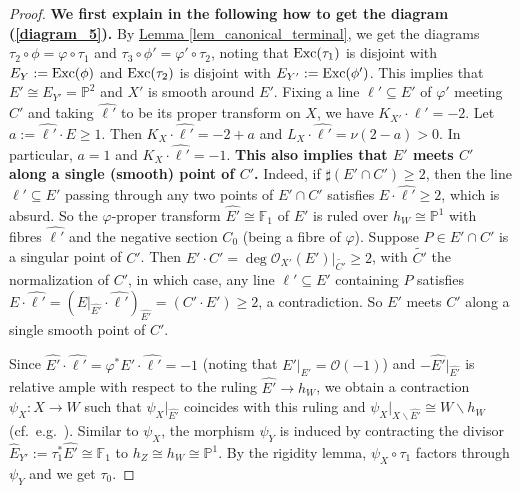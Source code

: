 \begin{proof}
\textbf{We first explain in the following how to get the  diagram (\ref{diagram_5}).}
By {\hyperref[lem_canonical_terminal]{Lemma  \ref*{lem_canonical_terminal}}}, we get the diagrams $\tau_2\circ\phi=\varphi\circ\tau_1$ and $\tau_3\circ\phi'=\varphi'\circ\tau_2$,
noting that $\textup{Exc}(\tau_1)$ is disjoint with $E_Y:=\textup{Exc}(\phi)$ and $\textup{Exc}(\tau_2)$ is  disjoint with $E_{Y'}:=\textup{Exc}(\phi')$.
This implies that $E'\cong E_{Y'}=\mathbb{P}^2$ and  $X'$ is smooth around $E'$.
Fixing a line $\ell'\subseteq E'$ of $\varphi'$ meeting $C'$ and taking $\hat{\ell'}$ to be its proper transform on  $X$,  we have
$K_{X'}\cdot \ell'=-2$.
Let $a:=\hat{\ell'}\cdot E\geqslant 1$. 
Then $K_X\cdot\hat{\ell'}=-2+a$ and $L_X\cdot\hat{\ell'}=\nu(2-a)>0$.
In particular, $a=1$ and $K_X\cdot\hat{\ell'}=-1$.
\textbf{This also implies that $E'$  meets $C'$ along a  single (smooth) point of $C'$.}
Indeed, if $\sharp (E'\cap C')\geqslant 2$, then the line $\ell'\subseteq E'$ passing through any two points of $E'\cap C'$ satisfies $E\cdot\hat{\ell'}\geqslant 2$, which is absurd. 
So the $\varphi$-proper transform $\hat{E'}\cong\mathbb{F}_1$ of $E'$ is ruled over $h_W\cong\mathbb{P}^1$ with fibres $\hat{\ell'}$ and the negative section $C_0$ (being a fibre of $\varphi$). 
Suppose $P\in E'\cap C'$ is a singular point  of $C'$.  
Then   $E'\cdot C'=\deg \mathcal{O}_{X'}(E')|_{\widetilde{C'}}\geqslant 2$, with $\widetilde{C'}$  the normalization of $C'$, in which case,
any line $\ell'\subseteq E'$ containing $P$ satisfies  $E\cdot\hat{\ell'}=(E|_{\hat{E'}}\cdot\hat{\ell'})_{\hat{E'}}=(C'\cdot E')\geqslant 2$, a contradiction.
So  $E'$ meets $C'$ along a single smooth point of $C'$.

Since $\hat{E'}\cdot\hat{\ell'}=\varphi^*E'\cdot\hat{\ell'}=-1$ (noting that $E'|_{E'}=\mathcal{O}(-1)$) and  $-\hat{E'}|_{\hat{E'}}$ is  relative ample with respect to the ruling $\hat{E'}\to h_W$, we obtain a contraction $\psi_X:X\to W$   such that $\psi_X|_{\hat{E'}}$ coincides with this ruling and $\psi_X|_{X\backslash\hat{E'}}\cong W\backslash h_W$ (cf.~e.g.~\cite[Proposition 7.4]{HP16}). 
Similar to $\psi_X$, the morphism $\psi_Y$ is induced by contracting the divisor $\hat{E}_{Y'}:=\tau_1^*\hat{E'}\cong\mathbb{F}_1$ to $h_Z\cong h_W\cong\mathbb{P}^1$. 
By the rigidity lemma, $\psi_X\circ\tau_1$ factors through $\psi_Y$ 
and we get $\tau_0$.




\end{proof}
